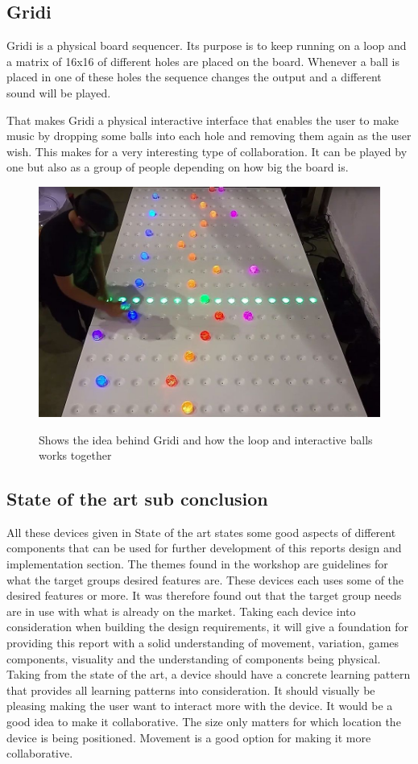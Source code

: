 \subsection{Gridi}
Gridi is a physical board sequencer. Its purpose is to keep running on a loop and a matrix of 16x16 of different holes are placed on the board. Whenever a ball is placed in one of these holes the sequence changes the output and a different sound will be played. 

That makes Gridi a physical interactive interface that enables the user to make music by dropping some balls into each hole and removing them again as the user wish. This makes for a very interesting type of collaboration. It can be played by one but also as a group of people depending on how big the board is. \cite{Gridi}
\begin{figure}[H]
	\centering
	\includegraphics[width=0.7\linewidth]{figure/Analysis/gridi}
	\label{fig:Gridi}
	\caption{Shows the idea behind Gridi and how the loop and interactive balls works together \cite{Gridi}}
\end{figure}



	 
\subsection{State of the art sub conclusion}
All these devices given in State of the art states some good aspects of different components that can be used for further development of this reports design and implementation section. The themes found in the workshop are guidelines for what the target groups desired features are. These devices each uses some of the desired features or more. It was therefore found out that the target group needs are in use with what is already on the market. Taking each device into consideration when building the design requirements, it will give a foundation for providing this report with a solid understanding of movement, variation, games components, visuality and the understanding of components being physical. Taking from the state of the art, a device should have a concrete learning pattern that provides all learning patterns into consideration. It should visually be pleasing making the user want to interact more with the device. It would be a good idea to make it collaborative. The size only matters for which location the device is being positioned. Movement is a good option for making it more collaborative.

